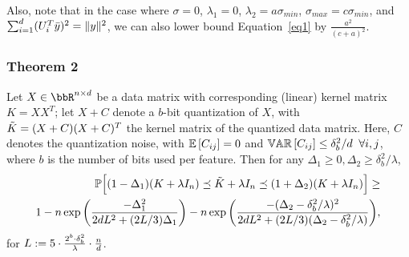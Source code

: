 Also, note that in the case where $\sigma = 0$, $\lambda_1 = 0$, $\lambda_2 = a \sigma_{min}$, $\sigma_{max} = c\sigma_{min}$, and $\sum_{i=1}^d (U_i^T \by)^2 = \|y\|^2$, we can also lower bound Equation~\eqref{eq1} by $\frac{a^2}{(c+a)^2}$.

\subsubsection{Theorem 2}

\begin{theorem}
	\label{thm2}
	Let $X \in \RR^{n\times d}$ be a data matrix with corresponding (linear) kernel matrix $K = XX^T$; let $X+C$ denote a $b$-bit quantization of $X$, with $\tK = (X+C)(X+C)^T$ the kernel matrix of the quantized data matrix. Here, $C$ denotes the quantization noise, with $\expect{}{C_{ij}} = 0$ and $\var{}{C_{ij}} \leq \delta_b^2/d \;\;\forall i,j$, where $b$ is the number of bits used per feature.
	Then for any $\Delta_1 \geq 0, \Delta_2 \geq \delta^2_b/\lambda$,
	\begin{eqnarray}
	\Prob\Big[(1 - \Delta_1) (K + \lambda I_n) \preceq \tK + \lambda I_n \preceq (1 + \Delta_2) (K + \lambda I_n)
	\Big] 
	\geq \\ 1 - 
	n \exp \bigg(\frac{-\Delta_1^2}{2dL^2 + (2L/3)\Delta_1}\bigg) -
	n \exp \bigg(\frac{-(\Delta_2-\delta_b^2/\lambda)^2}{2dL^2 + (2L/3)(\Delta_2-\delta_b^2/\lambda)}\bigg),
	\end{eqnarray}
	for $L \defeq 5 \cdot \frac{2^b \cdot \delta_b^2}{\lambda}\cdot \frac{n}{d}$.
\end{theorem}



